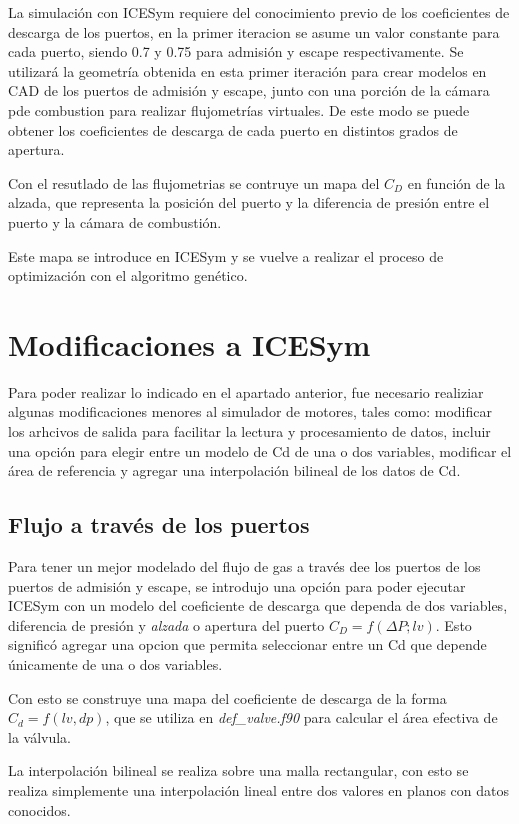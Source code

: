 La simulación con ICESym requiere del conocimiento previo de los coeficientes
de descarga de los puertos, en la primer iteracion se asume un valor constante
para cada puerto, siendo 0.7 y 0.75 para admisión y escape respectivamente.
%
Se utilizará la geometría obtenida en esta primer iteración para crear modelos
en CAD de los puertos de admisión y escape, junto con una porción de la cámara
pde combustion para realizar flujometrías virtuales.
%
De este modo se puede obtener los coeficientes de descarga de cada puerto en
distintos grados de apertura.

Con el resutlado de las flujometrias se contruye un mapa del $C_D$ en función
de la alzada, que representa la posición del puerto y la diferencia de presión
entre el puerto y la cámara de combustión.

Este mapa se introduce en ICESym y se vuelve a realizar el proceso de optimización
con el algoritmo genético.

\section{Modificaciones a ICESym}
%
Para poder realizar lo indicado en el apartado anterior, fue necesario
realiziar algunas modificaciones menores al simulador de motores, tales como:
modificar los arhcivos de salida para facilitar la lectura y procesamiento de
datos, incluir una opción para elegir entre un modelo de Cd de una o dos
variables, modificar el área de referencia y  agregar una interpolación
bilineal de los datos de Cd.

\subsection{Flujo a través de los puertos}
%
Para tener un mejor modelado del flujo de gas a través dee los puertos de los
puertos de admisión y escape, se introdujo una opción para poder ejecutar
ICESym con un modelo del coeficiente de descarga que dependa de dos variables,
diferencia de presión y \emph{alzada} o apertura del puerto $C_D = f(\Delta P;
lv)$.
%
Esto significó agregar una opcion que permita seleccionar entre un Cd que
depende únicamente de una o dos variables.

Con esto se construye una mapa del coeficiente de descarga de la forma $C_d =
f(lv, dp)$, que se utiliza en \emph{def\_valve.f90} para calcular el área
efectiva de la válvula.

La interpolación bilineal se realiza sobre una malla rectangular, con esto se
realiza simplemente una interpolación lineal entre dos valores en planos con
datos conocidos.

